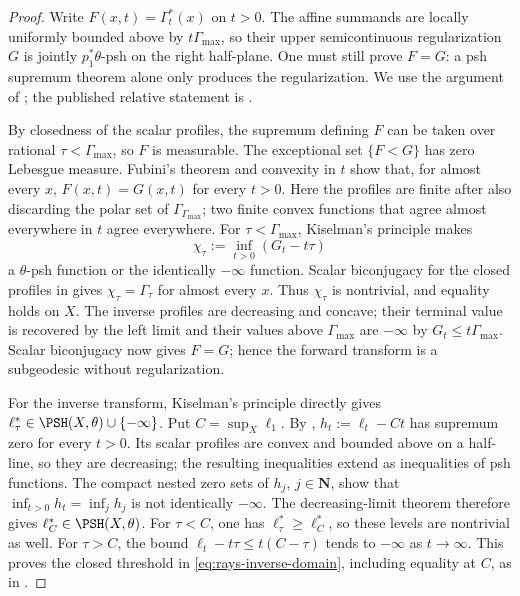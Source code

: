 \begin{proof}
Write $F(x,t)=\Gamma_t^*(x)$ on $t>0$.
The affine summands are locally uniformly bounded above by
$t\Gamma_{\max}$, so their upper semicontinuous regularization
$G$ is jointly $p_1^*\theta$-psh on the right half-plane.
One must still prove $F=G$: a psh supremum theorem alone only
produces the regularization.
We use the argument of \cite[Lemma~9.2.1]{XiaBook};
the published relative statement is \cite[Lemma~2.4]{DXZ23}.

By closedness of the scalar profiles, the supremum defining $F$
can be taken over rational $\tau<\Gamma_{\max}$, so $F$ is
measurable.  The exceptional set $\{F<G\}$ has zero Lebesgue measure.
Fubini's theorem and convexity in $t$ show that, for almost every
$x$, $F(x,t)=G(x,t)$ for every $t>0$.
Here the profiles are finite after also discarding the polar set
of $\Gamma_{\Gamma_{\max}}$; two finite convex functions that
agree almost everywhere in $t$ agree everywhere.
For $\tau<\Gamma_{\max}$, Kiselman's principle makes
\[
                   \chi_\tau:=\inf_{t>0}(G_t-t\tau)
\]
a $\theta$-psh function or the identically $-\infty$ function.
Scalar biconjugacy for the closed profiles in
 gives
$\chi_\tau=\Gamma_\tau$ for almost every $x$.
Thus $\chi_\tau$ is nontrivial, and equality holds on $X$.
The inverse profiles are decreasing and concave; their terminal
value is recovered by the left limit and their values above
$\Gamma_{\max}$ are $-\infty$ by $G_t\leq t\Gamma_{\max}$.
Scalar biconjugacy now gives $F=G$; hence the forward transform
is a subgeodesic without regularization.

For the inverse transform, Kiselman's principle directly gives
$\ell_\tau^*\in\PSH(X,\theta)\cup\{-\infty\}$.
Put $C=\sup_X\ell_1$.  By ,
$h_t:=\ell_t-Ct$ has supremum zero for every $t>0$.
Its scalar profiles are convex and bounded above on a half-line,
so they are decreasing; the resulting inequalities extend as
inequalities of psh functions.
The compact nested zero sets of $h_j$, $j\in\mathbf N$, show that
$\inf_{t>0}h_t=\inf_jh_j$ is not identically $-\infty$.
The decreasing-limit theorem therefore gives
$\ell_C^*\in\PSH(X,\theta)$.
For $\tau<C$, one has $\ell_\tau^*\geq\ell_C^*$, so these levels
are nontrivial as well.
For $\tau>C$, the bound
$\ell_t-t\tau\leq t(C-\tau)$ tends to $-\infty$ as $t\to\infty$.
This proves the closed threshold in \eqref{eq:rays-inverse-domain},
including equality at $C$, as in \cite[Lemma~9.2.4]{XiaBook}.
\end{proof}

